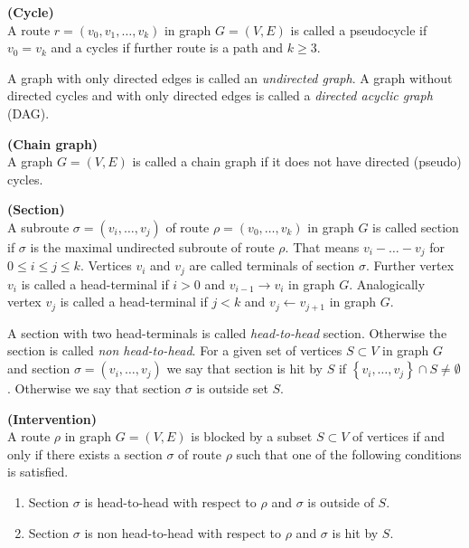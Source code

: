 \begin{defi} {\textbf{(Cycle)}} \\
	A route $r = (v_0, v_1, \dots, v_k)$ in graph $G = (V, E)$ is called a pseudocycle if $v_0 = v_k$ and 
	a cycles if further route is a path and $k \ge 3$.
\end{defi}

A graph with only directed edges is called an \textit{undirected graph}. A graph without directed cycles 
and with only directed edges is called a \textit{directed acyclic graph} (DAG).


\begin{defi} {\textbf{(Chain graph)}} \\
	A graph $G = (V, E)$ is called a chain graph if it does not have directed (pseudo) cycles.
\end{defi}



\begin{defi} {\textbf{(Section)}} \\
	A subroute $\sigma = (v_i, \dots, v_j)$ of route $\rho = (v_0, \dots, v_k)$ in graph $G$ is called section if $			\sigma$ is the maximal undirected subroute of route $\rho$. That means $v_i - \dots - v_j$ for $0 \le i \le j 			\le k$. Vertices $v_i$ and $v_j$ are called terminals of section $\sigma$. Further vertex $v_i$ is called a 			head-terminal if $i>0$ and $v_{i-1} \rightarrow v_i$ in graph $G$. Analogically vertex $v_j$ is called 
	a head-terminal if $j<k$ and $v_j \leftarrow v_{j+1}$ in graph $G$.
\end{defi}


A section with two head-terminals is called \textit{head-to-head} section. Otherwise the section is called 
\textit{non head-to-head}. For a given set of vertices $S \subset V$ in graph $G$ and section $\sigma = (v_i, \dots, v_j)$ we say that section is hit by $S$ if $\left\lbrace v_i , \dots, v_j \right\rbrace \cap S \neq \emptyset$. Otherwise we say that section $\sigma$ is outside set $S$.



\begin{defi} {\textbf{(Intervention)}} \\
	A route $\rho$ in graph $G = (V, E)$ is blocked by a subset $S \subset V$ of vertices if and only if there 				exists a section $\sigma$ of route $\rho$ such that one of the following conditions is satisfied.
	
	\begin{enumerate}
		\item Section $\sigma$ is head-to-head with respect to $\rho$ and $\sigma$ is outside of $S$.
		\item Section $\sigma$ is non head-to-head with respect to $\rho$ and $\sigma$ is hit by $S$.
	\end{enumerate}
	
\end{defi}



